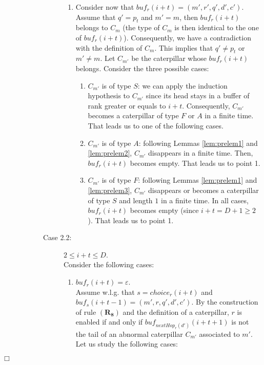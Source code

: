 \documentclass[11pt]{article}
\newenvironment{proof}{{\noindent\bf Proof. } }{{\hfill $\Box$}}
\begin{document}
\begin{proof}
\begin{description}
\begin{description}
\begin{description}
\begin{enumerate}
\item Consider now that $buf_{r}(i+t)=(m',r',q',d',c')$.\\
Assume that $q'=p_{t}$ and $m'=m$, then  $buf_{r}(i+t)$ belongs to $C_{m}$ (the type of $C_{m}$ is then identical to the one of  $buf_{r}(i+t)$). Consequently, we have a contradiction with the definition of $C_{m}$. This implies that $q'\neq p_{t}$ or $m'\neq m$. Let $C_{m'}$ be the caterpillar whose $buf_{r}(i+t)$ belongs. Consider the three possible cases:

\begin{enumerate}
\item $C_{m'}$ is of type $S$: we can apply the induction hypothesis to $C_{m'}$ since its head stays in a buffer of rank greater or equals to $i+t$. Consequently, $C_{m'}$ becomes a caterpillar of type $F$ or $A$ in a finite time. That leads us to one of the following cases.
\item $C_{m'}$ is of type $A$: following Lemmas \ref{lem:prelem1} and \ref{lem:prelem2}, $C_{m'}$ disappears in a finite time. Then, $buf_{r}(i+t)$ becomes empty. That leads us to point 1.
\item $C_{m'}$ is of type $F$:  following Lemmas \ref{lem:prelem1} and \ref{lem:prelem3}, $C_{m'}$ disappears or becomes a caterpillar of type $S$ and length $1$ in a finite time. In all cases, $buf_{r}(i+t)$ becomes empty (since $i+t=D+1\geq2$). That leads us to point 1.
\end{enumerate}
\end{enumerate}

\item [Case 2.2:] $2\leq i+t\leq D$.\\
Consider the following cases:

\begin{enumerate}
\item $buf_{r}(i+t)=\varepsilon$.\\
Assume w.l.g. that $s=choice_{r}(i+t)$ and $buf_{s}(i+t-1)=(m',r,q',d',c')$.
By the construction of rule $\boldsymbol{(R_{8})}$ and the definition of a caterpillar, $r$ is enabled if and only if $buf_{nextHop_{r}(d')}(i+t+1)$ is not the tail of an abnormal caterpillar $C_{m'}$ associated to $m'$. Let us study the following cases:


\end{enumerate}
\end{description}
\end{description}
\end{description}
\end{proof}
\end{document}
